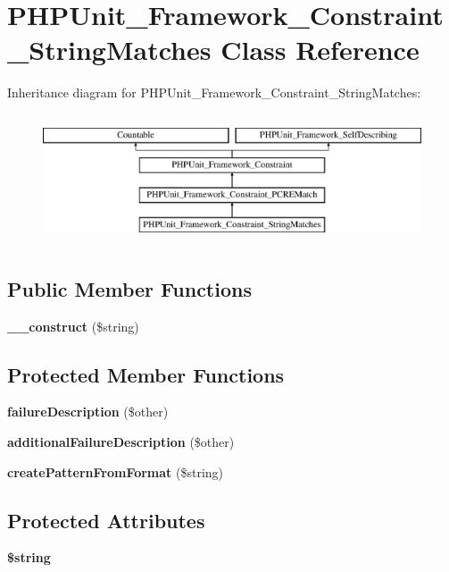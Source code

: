 \section{P\+H\+P\+Unit\+\_\+\+Framework\+\_\+\+Constraint\+\_\+\+String\+Matches Class Reference}
\label{class_p_h_p_unit___framework___constraint___string_matches}
Inheritance diagram for P\+H\+P\+Unit\+\_\+\+Framework\+\_\+\+Constraint\+\_\+\+String\+Matches\+:\begin{figure}[H]
\begin{center}
\leavevmode
\includegraphics[height=3.888889cm]{class_p_h_p_unit___framework___constraint___string_matches}
\end{center}
\end{figure}
\subsection*{Public Member Functions}
\begin{DoxyCompactItemize}
\item 
{\bf \+\_\+\+\_\+construct} (\$string)
\end{DoxyCompactItemize}
\subsection*{Protected Member Functions}
\begin{DoxyCompactItemize}
\item 
{\bf failure\+Description} (\$other)
\item 
{\bf additional\+Failure\+Description} (\$other)
\item 
{\bf create\+Pattern\+From\+Format} (\$string)
\end{DoxyCompactItemize}
\subsection*{Protected Attributes}
\begin{DoxyCompactItemize}
\item 
{\bf \$string}
\end{DoxyCompactItemize}


